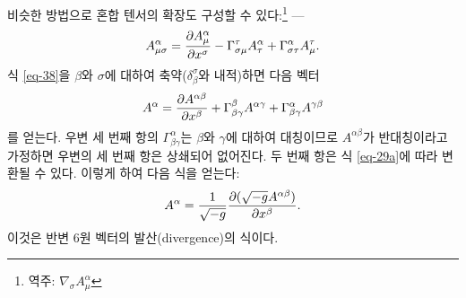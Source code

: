 \documentclass[b5paper]{article}
\begin{document}
비슷한 방법으로 혼합 텐서의 확장도 구성할 수 있다:\footnote{역주: $\nabla_\sigma A_{\mu}^{\alpha}$} ---
\begin{equation} \label{eq-39}
A_{\mu\sigma}^{\alpha}
= {\frac{{\partial}{A_{\mu}^{\alpha}}}{{\partial}{x^\sigma}}}
- \Gamma_{\sigma\mu}^\tau A_{\tau}^{\alpha} 
+ \Gamma_{\sigma\tau}^\alpha A_{\mu}^{\tau}.
\end{equation}
식 \eqref{eq-38}을 \ind{} $\beta$와 $\sigma$에 대하여 축약($\delta_\beta^\sigma$와 내적)하면 다음 벡터
\begin{equation*}
A^\alpha = {\frac{{\partial}{A^{\alpha\beta}}}{{\partial}{x^\beta}}}
+ \Gamma_{\beta\gamma}^\beta A^{\alpha\gamma}
+ \Gamma_{\beta\gamma}^\alpha A^{\gamma\beta} 
\end{equation*}
를 얻는다. 우변 세 번째 항의 $\Gamma_{\beta\gamma}^\alpha$는 \ind{} $\beta$와 $\gamma$에 대하여 대칭이므로 $A^{\alpha\beta}$가 반대칭이라고 가정하면 우변의 세 번째 항은 상쇄되어 없어진다. 두 번째 항은 식 \eqref{eq-29a}에 따라 변환될 수 있다. 이렇게 하여 다음 식을 얻는다:
\begin{equation} \label{eq-40}
	A^\alpha = \frac{1}{\sqrt{-g}}{\frac{{\partial}{(\sqrt{-g}A^{\alpha\beta})}}{{\partial}{x^\beta}}}.
\end{equation}
이것은 반변 6원 벡터의 발산(divergence)의 식이다.
\end{document}
